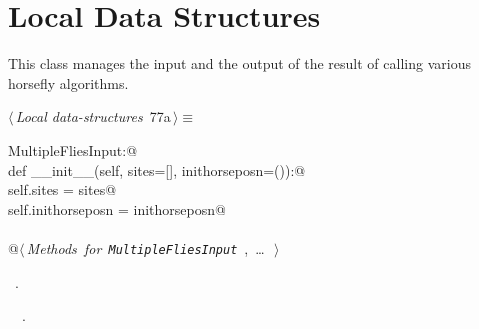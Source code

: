 \documentclass[11.5pt]{report}
\begin{document}
\needspace{7cm}
\section{Local Data Structures}


\newchunk This class manages the input and the output of the result of 
calling various horsefly algorithms. 

\begin{flushleft} \small
\begin{minipage}{\linewidth}\label{scrap109}\raggedright\small
{} $\langle\,${\itshape Local data-structures}\nobreak\ {\footnotesize {77a}}$\,\rangle\equiv$
\vspace{-1ex}
\begin{list}{}{} \item
\mbox{}\verb@class MultipleFliesInput:@\\
\mbox{}\verb@      def __init__(self, sites=[], inithorseposn=()):@\\
\mbox{}\verb@           self.sites           = sites@\\
\mbox{}\verb@           self.inithorseposn   = inithorseposn@\\
\mbox{}\verb@@\\
\mbox{}\verb@      @\hbox{$\langle\,${\itshape Methods for \verb|MultipleFliesInput|}\nobreak\ {\footnotesize {}, \ldots\ }$\,\rangle$}\verb@@\\
\mbox{}\verb@@{\NWsep}
\end{list}
\vspace{-1.5ex}
\footnotesize
\begin{list}{}{\setlength{\itemsep}{-\parsep}\setlength{\itemindent}{-\leftmargin}}
\item \NWtxtMacroRefIn\ .
\item \NWtxtIdentsDefed\nobreak\  \verb@HorseFlyInput@\nobreak\ \NWtxtIdentsNotUsed.
\item{}
\end{list}
\end{minipage}\vspace{4ex}
\end{flushleft}
\end{document}
